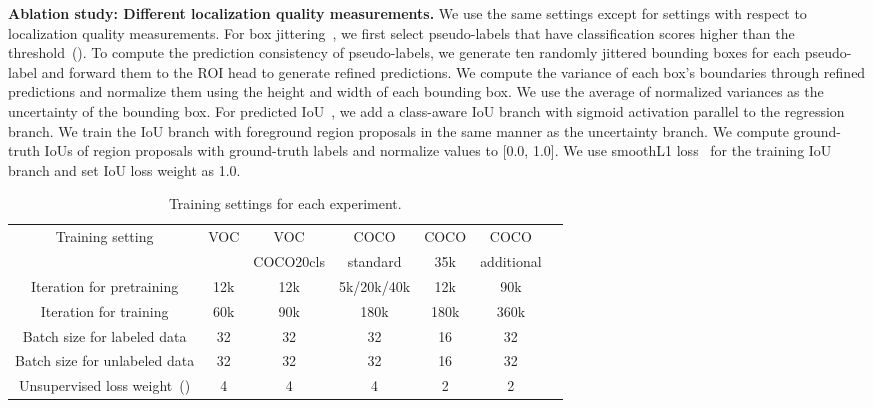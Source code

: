 \documentclass{bmvc2k}
\begin{document}
\noindent\textbf{Ablation study: Different localization quality measurements.}
We use the same settings except for settings with respect to localization quality measurements.
For box jittering~\cite{xu2021soft}, we first select pseudo-labels that have classification scores higher than the threshold~(). To compute the prediction consistency of pseudo-labels, we generate ten randomly jittered bounding boxes for each pseudo-label and forward them to the ROI head to generate refined predictions. We compute the variance of each box's boundaries through refined predictions and normalize them using the height and width of each bounding box. We use the average of normalized variances as the uncertainty of the bounding box.
For predicted IoU~\cite{wang20213dioumatch}, we add a class-aware IoU branch with sigmoid activation parallel to the regression branch. We train the IoU branch with foreground region proposals in the same manner as the uncertainty branch. We compute ground-truth IoUs of region proposals with ground-truth labels and normalize values to [0.0, 1.0]. We use smoothL1 loss~\cite{girshick2015fast} for the training IoU branch and set IoU loss weight as 1.0.

\begin{table}[h]
\centering
\scriptsize
\begin{tabular}{ccccccc}
\toprule
\multirow{2}{*}{Training setting} & \multirow{2}{*}{VOC} & VOC & COCO & COCO & COCO \\
{} & {} & COCO20cls & standard & 35k & additional & {} \\
\toprule
Iteration for pretraining & 12k & 12k & 5k/20k/40k & 12k  & 90k  \\
\midrule
Iteration for training & 60k & 90k & 180k & 180k  & 360k  \\
\midrule
Batch size for labeled data & 32 & 32 & 32 & 16  & 32  \\
\midrule
Batch size for unlabeled data & 32  & 32 & 32 & 16 & 32 \\
\midrule
Unsupervised loss weight~()  & 4 & 4  & 4  & 2  & 2 \\
\bottomrule
\end{tabular}\caption{Training settings for each experiment.}
\label{tab:training setting}
\end{table}
\end{document}
